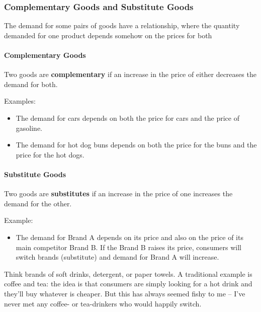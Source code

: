 \hypertarget{complementary-goods-and-substitute-goods}{%
\subsubsection{Complementary Goods and Substitute
Goods}\label{complementary-goods-and-substitute-goods}}

The demand for some pairs of goods have a relationship, where the
quantity demanded for one product depends somehow on the prices for both

\hypertarget{complementary-goods}{%
\paragraph{Complementary Goods}\label{complementary-goods}}

Two goods are \textbf{complementary} if an increase in the price of
either decreases the demand for both.

Examples:

\begin{itemize}
\tightlist
\item
  The demand for cars depends on both the price for cars and the price
  of gasoline.
\item
  The demand for hot dog buns depends on both the price for the buns and
  the price for the hot dogs.
\end{itemize}

\hypertarget{substitute-goods}{%
\paragraph{Substitute Goods}\label{substitute-goods}}

Two goods are \textbf{substitutes} if an increase in the price of one
increases the demand for the other.

Example:

\begin{itemize}
\tightlist
\item
  The demand for Brand A depends on its price and also on the price of
  its main competitor Brand B. If the Brand B raises its price,
  consumers will switch brands (substitute) and demand for Brand A will
  increase.
\end{itemize}

Think brands of soft drinks, detergent, or paper towels. A traditional
example is coffee and tea: the idea is that consumers are simply looking
for a hot drink and they'll buy whatever is cheaper. But this has always
seemed fishy to me -- I've never met any coffee- or tea-drinkers who
would happily switch.

